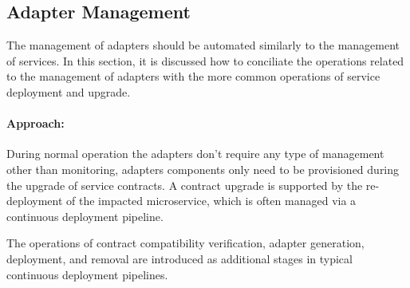 \subsection{Adapter Management} %
\label{sec:adapter_management}

The management of adapters should be automated similarly to the management of services.
In this section, it is discussed how to conciliate the operations related to the management of adapters with the more common operations of service deployment and upgrade.

\paragraph{Approach:}
During normal operation the adapters don't require any type of management other than monitoring,
adapters components only need to be provisioned during the upgrade of service contracts.
A contract upgrade is supported by the re-deployment of the impacted microservice, which is often managed via a continuous deployment pipeline.

The operations of contract compatibility verification, adapter generation, deployment,
and removal are introduced as additional stages in typical continuous deployment pipelines.
